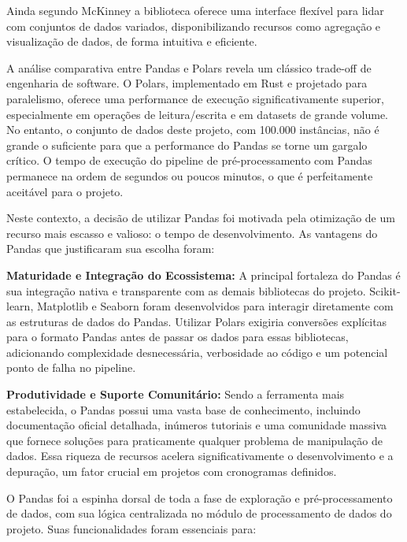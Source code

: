 Ainda segundo McKinney\cite{McKinney2010} a biblioteca oferece uma interface flexível para lidar com conjuntos de dados variados, disponibilizando recursos como agregação e visualização de dados, de forma intuitiva e eficiente. 

A análise comparativa entre Pandas e Polars revela um clássico trade-off de engenharia de software. O Polars, implementado em Rust e projetado para paralelismo, oferece uma performance de execução significativamente superior, especialmente em operações de leitura/escrita e em datasets de grande volume. No entanto, o conjunto de dados deste projeto, com 100.000 instâncias, não é grande o suficiente para que a performance do Pandas se torne um gargalo crítico. O tempo de execução do pipeline de pré-processamento com Pandas permanece na ordem de segundos ou poucos minutos, o que é perfeitamente aceitável para o projeto.

Neste contexto, a decisão de utilizar Pandas foi motivada pela otimização de um recurso mais escasso e valioso: o tempo de desenvolvimento. As vantagens do Pandas que justificaram sua escolha foram:

\textbf{Maturidade e Integração do Ecossistema:} A principal fortaleza do Pandas é sua integração nativa e transparente com as demais bibliotecas do projeto. Scikit-learn, Matplotlib e Seaborn foram desenvolvidos para interagir diretamente com as estruturas de dados do Pandas. Utilizar Polars exigiria conversões explícitas para o formato Pandas antes de passar os dados para essas bibliotecas, adicionando complexidade desnecessária, verbosidade ao código e um potencial ponto de falha no pipeline.

\textbf{Produtividade e Suporte Comunitário:} Sendo a ferramenta mais estabelecida, o Pandas possui uma vasta base de conhecimento, incluindo documentação oficial detalhada, inúmeros tutoriais e uma comunidade massiva que fornece soluções para praticamente qualquer problema de manipulação de dados. Essa riqueza de recursos acelera significativamente o desenvolvimento e a depuração, um fator crucial em projetos com cronogramas definidos.

O Pandas foi a espinha dorsal de toda a fase de exploração e pré-processamento de dados, com sua lógica centralizada no módulo de processamento de dados do projeto. Suas funcionalidades foram essenciais para:

